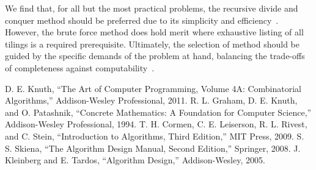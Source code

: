 \documentclass[conference]{IEEEtran}
\begin{document}
We find that, for all but the most practical problems, the recursive divide and conquer method should be preferred due to its simplicity and efficiency~\cite{b1, b2}. However, the brute force method does hold merit where exhaustive listing of all tilings is a required prerequisite. Ultimately, the selection of method should be guided by the specific demands of the problem at hand, balancing the trade-offs of completeness against computability~\cite{b3, b5}.

\begin{thebibliography}{00}
 D. E. Knuth, ``The Art of Computer Programming, Volume 4A: Combinatorial Algorithms,'' Addison-Wesley Professional, 2011.
 R. L. Graham, D. E. Knuth, and O. Patashnik, ``Concrete Mathematics: A Foundation for Computer Science,'' Addison-Wesley Professional, 1994.
 T. H. Cormen, C. E. Leiserson, R. L. Rivest, and C. Stein, ``Introduction to Algorithms, Third Edition,'' MIT Press, 2009.
 S. S. Skiena, ``The Algorithm Design Manual, Second Edition,'' Springer, 2008.
 J. Kleinberg and E. Tardos, ``Algorithm Design,'' Addison-Wesley, 2005.
\end{thebibliography}
\end{document}
